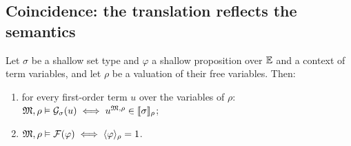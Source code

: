 \subsection{Coincidence: the translation reflects the semantics}
\label{sec:semantics-coincidence}

\begin{lemma}[Coincidence]
\label{lem:coincidence}
Let $\sigma$ be a shallow set type and $\varphi$ a shallow proposition
over $\mathbb{E}$ and a context of term variables, and let $\rho$ be a
valuation of their free variables.  Then:
\begin{enumerate}[leftmargin=2em]
\item for every first-order term $u$ over the variables of $\rho$:\quad
  $\mathfrak{M}, \rho \vDash \mathcal{G}_{\sigma}(u) \iff u^{\mathfrak{M},\rho} \in
  [\![ \sigma ]\!]_{\rho}$;
\item $\mathfrak{M}, \rho \vDash \mathcal{F}(\varphi) \iff \langle \varphi \rangle_{\rho} = 1$.
\end{enumerate}
\end{lemma}

